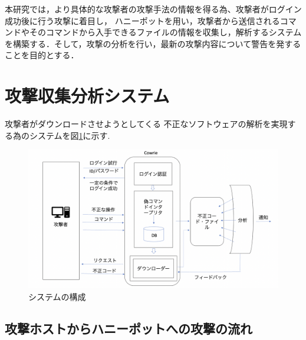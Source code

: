 \documentclass{entry}
\begin{document}
本研究では，より具体的な攻撃者の攻撃手法の情報を得る為、攻撃者がログイン成功後に行う攻撃に着目し，
ハニーポットを用い，攻撃者から送信されるコマンドやそのコマンドから入手できるファイルの情報を収集し，解析するシステムを構築する．そして，攻撃の分析を行い，最新の攻撃内容について警告を発することを目的とする．

\section{攻撃収集分析システム}

攻撃者がダウンロードさせようとしてくる
不正なソフトウェアの解析を実現する為のシステムを図\ref{fig:system}に示す.

\begin{figure}[htbp]
	\centering
 	\includegraphics[width=\linewidth]{hpsystem.png}
 	\caption{システムの構成}\label{fig:system}
\end{figure}



\subsection{攻撃ホストからハニーポットへの攻撃の流れ}



\end{document}
